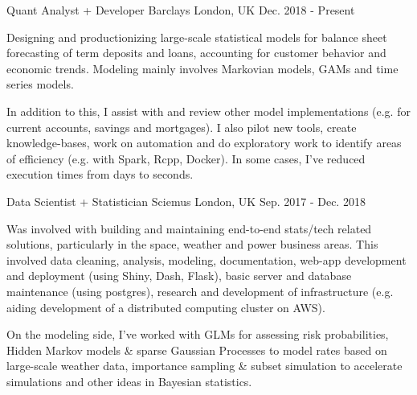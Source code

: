 

\begin{cventries}

  \cventry
    {Quant Analyst + Developer} %
    {Barclays} %
    {London, UK} %
    {Dec. 2018 - Present} %
    {
      \begin{cvitems} %
        \item {Designing and productionizing large-scale statistical models for balance sheet forecasting of term deposits and loans, accounting for customer behavior and economic trends. Modeling mainly involves Markovian models, GAMs and time series models.}
        \item {In addition to this, I assist with and review other model implementations (e.g. for current accounts, savings and mortgages). I also pilot new tools, create knowledge-bases, work on automation and do exploratory work to identify areas of efficiency (e.g. with Spark, Rcpp, Docker). In some cases, I've reduced execution times from days to seconds.}
      \end{cvitems}
    }

  \cventry
    {Data Scientist + Statistician} %
    {Sciemus} %
    {London, UK} %
    {Sep. 2017 - Dec. 2018} %
    {
      \begin{cvitems} %
        \item {Was involved with building and maintaining end-to-end stats/tech related solutions, particularly in the space, weather and power business areas. This involved data cleaning, analysis, modeling, documentation, web-app development and deployment (using Shiny, Dash, Flask), basic server and database maintenance (using postgres), research and development of infrastructure (e.g. aiding development of a distributed computing cluster on AWS).}
        \item {On the modeling side, I’ve worked with GLMs for assessing risk probabilities, Hidden Markov models \& sparse Gaussian Processes to model rates based on large-scale weather data, importance sampling \& subset simulation to accelerate simulations and other ideas in Bayesian statistics.}
      \end{cvitems}
    }

\end{cventries}
